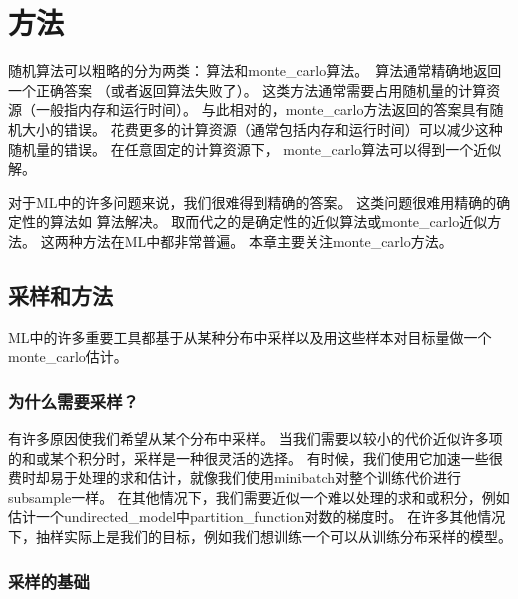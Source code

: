 \chapter{方法}
\label{chap:monte_carlo_methods}

随机算法可以粗略的分为两类：\,算法和\gls{monte_carlo}算法。
\,算法通常精确地返回一个正确答案 （或者返回算法失败了）。   
这类方法通常需要占用随机量的计算资源（一般指内存和运行时间）。    %
与此相对的，\gls{monte_carlo}方法返回的答案具有随机大小的错误。 
花费更多的计算资源（通常包括内存和运行时间）可以减少这种随机量的错误。 %
在任意固定的计算资源下， \gls{monte_carlo}算法可以得到一个近似解。

对于\gls{ML}中的许多问题来说，我们很难得到精确的答案。
这类问题很难用精确的确定性的算法如\,\,算法解决。
取而代之的是确定性的近似算法或\gls{monte_carlo}近似方法。
这两种方法在\gls{ML}中都非常普遍。
本章主要关注\gls{monte_carlo}方法。

\section{采样和方法}
\label{sec:sampling_and_monte_carlo_methods}

\gls{ML}中的许多重要工具都基于从某种分布中采样以及用这些样本对目标量做一个\gls{monte_carlo}估计。  %

\subsection{为什么需要采样？}
\label{sec:why_sampling}

有许多原因使我们希望从某个分布中采样。  
当我们需要以较小的代价近似许多项的和或某个积分时，采样是一种很灵活的选择。  
有时候，我们使用它加速一些很费时却易于处理的求和估计，就像我们使用\gls{minibatch}对整个训练代价进行\gls{subsample}一样。 
在其他情况下，我们需要近似一个难以处理的求和或积分，例如估计一个\gls{undirected_model}中\gls{partition_function}对数的梯度时。   %
在许多其他情况下，抽样实际上是我们的目标，例如我们想训练一个可以从训练分布采样的模型。  

\subsection{采样的基础}
\label{sec:basics_of_monte_carlo_sampling}

